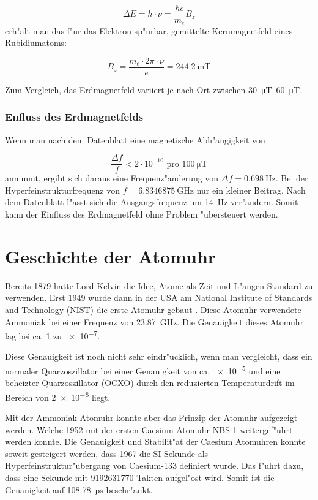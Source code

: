 \begin{refsection}
\begin{equation*}
  \Delta E = h\cdot\nu = \dfrac{\hbar e}{m_e}B_z
\end{equation*}
erh"alt man das f"ur das Elektron sp"urbar, gemittelte Kernmagnetfeld
eines Rubidiumatoms:

\begin{equation*}
  B_z = \dfrac{m_e\cdot2\pi\cdot\nu}{e} = \SI{244.2}{\milli\tesla}
\end{equation*}

Zum Vergleich, das Erdmagnetfeld variiert je nach Ort zwischen
\SIrange[range-phrase={ bis }, range-units=single]{30}{60}{\micro\tesla}.

\subsubsection{Enfluss des Erdmagnetfelds}
Wenn man nach dem Datenblatt \cite{datasheet:prs10m} eine magnetische
Abh"angigkeit von

\begin{equation*}
  \dfrac{\Delta f}{f} < 2\cdot 10^{-10} \text{ pro } \SI{100}{\micro\tesla}
\end{equation*}
annimmt, ergibt sich daraus eine Frequenz"anderung von \(\Delta
f=\SI{0.698}{\hertz}\).  Bei der Hyperfeinstrukturfrequenz von \(f =
\SI{6.8346875}{\giga\hertz}\) nur ein kleiner Beitrag.  Nach dem
Datenblatt l"asst sich die Ausgangsfrequenz um \SI{14}{\hertz}
ver"andern.  Somit kann der Einfluss des Erdmagnetfeld ohne Problem
"ubersteuert werden.

\section{Geschichte der Atomuhr
\label{sec:gesch-der-atom}}
Bereits 1879 hatte Lord Kelvin die Idee, Atome als Zeit und L"angen
Standard zu verwenden.  Erst 1949 wurde dann in der USA am National
Institute of Standards and Technology (NIST) die erste Atomuhr gebaut
\cite{ieee:nist}.  Diese Atomuhr verwendete Ammoniak bei einer
Frequenz von \SI{23.87}{\giga\hertz}.  Die Genauigkeit dieses Atomuhr
lag bei ca. 1 zu \num{e-7}.

Diese Genauigkeit ist noch nicht sehr eindr"ucklich, wenn man
vergleicht, dass ein normaler Quarzoszillator bei einer Genauigkeit
von ca. \num{e-5} und eine beheizter Quarzoszillator (OCXO) durch den
reduzierten Temperaturdrift im Bereich von \num{2e-8} liegt.

Mit der Ammoniak Atomuhr konnte aber das Prinzip der Atomuhr
aufgezeigt werden.  Welche 1952 mit der ersten Caesium Atomuhr NBS-1
weitergef"uhrt werden konnte.  Die Genauigkeit und Stabilit"at der
Caesium Atomuhren konnte soweit gesteigert werden, dass 1967 die
SI-Sekunde als Hyperfeinstruktur"ubergang von Caesium-133 definiert
wurde.  Das f"uhrt dazu, dass eine Sekunde mit \num{9192631770} Takten
aufgel"ost wird.  Somit ist die Genauigkeit auf
\SI{108.78}{\pico\second} beschr"ankt.


\end{refsection}
